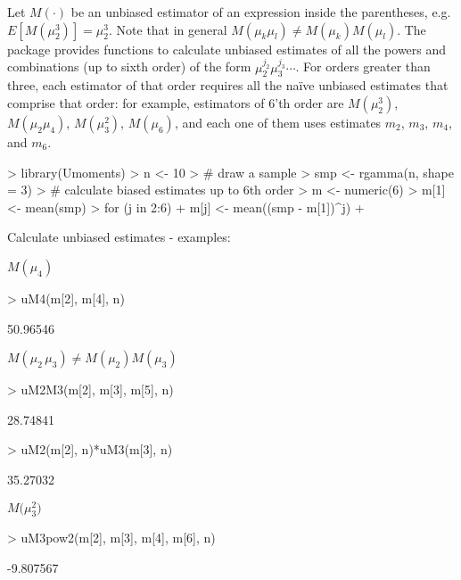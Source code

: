 \documentclass[12pt]{article}
\begin{document}
\begin{sloppypar}
Let $M(\cdot)$ be an unbiased estimator of an expression inside the parentheses, e.g. $E\left[M(\mu_2^3)\right] = \mu_2^3$. Note that in general $M(\mu_k \mu_l) \neq M(\mu_k) M(\mu_l)$. The package provides functions to calculate unbiased estimates of all the powers and combinations (up to sixth order) of the form $\mu_2^{j_2} \mu_3^{j_3} \dotsm$. For orders greater than three, each estimator of that order requires all the na\"ive unbiased estimates that comprise that order: for example, estimators of $6$'th order are $M(\mu_2^3)$, $M(\mu_2 \mu_4)$, $M(\mu_3^2)$, $M(\mu_6)$, and each one of them uses estimates $m_2$, $m_3$, $m_4$, and $m_6$.
\end{sloppypar}

\begin{Schunk}
\begin{Sinput}
> library(Umoments)
> n <- 10
> # draw a sample
> smp <- rgamma(n, shape = 3)
> # calculate biased estimates up to 6th order
> m <- numeric(6)
> m[1] <- mean(smp)
> for (j in 2:6) {
+   m[j] <- mean((smp - m[1])^j)
+ }
\end{Sinput}
\end{Schunk}

Calculate unbiased estimates - examples:

$M(\mu_4)$
\begin{Schunk}
\begin{Sinput}
> uM4(m[2], m[4], n)
\end{Sinput}
\begin{Soutput}
[1] 50.96546
\end{Soutput}
\end{Schunk}
$M(\mu_2 \, \mu_3) \neq M(\mu_2) M(\mu_3)$
\begin{Schunk}
\begin{Sinput}
> uM2M3(m[2], m[3], m[5], n)
\end{Sinput}
\begin{Soutput}
[1] 28.74841
\end{Soutput}
\begin{Sinput}
> uM2(m[2], n)*uM3(m[3], n)
\end{Sinput}
\begin{Soutput}
[1] 35.27032
\end{Soutput}
\end{Schunk}
$M\big(\mu_3^2\big)$
\begin{Schunk}
\begin{Sinput}
> uM3pow2(m[2], m[3], m[4], m[6], n)
\end{Sinput}
\begin{Soutput}
[1] -9.807567
\end{Soutput}
\end{Schunk}
\end{document}

